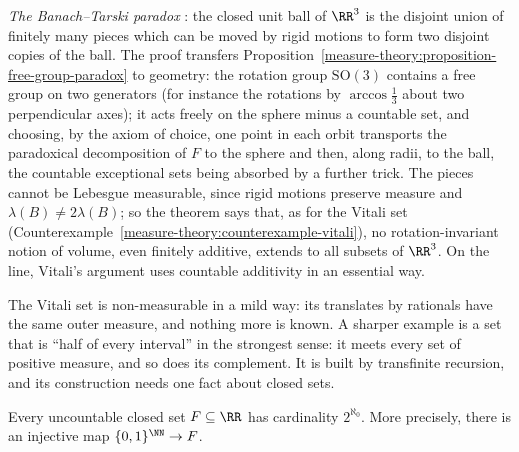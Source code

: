\begin{remark}\label{measure-theory:remark-banach-tarski}
\emph{The Banach--Tarski paradox} \cite{banach-tarski-1924}: the closed unit ball of $\RR^3$ is the disjoint union of finitely many pieces which can be moved by rigid motions to form two
disjoint copies of the ball. The proof transfers Proposition~\ref{measure-theory:proposition-free-group-paradox} to geometry: the rotation group $\mathrm{SO}(3)$ contains a free group on two generators (for
instance the rotations by $\arccos\frac13$ about two perpendicular axes); it acts freely on the sphere minus a countable set, and choosing, by the axiom of choice, one point in each orbit transports the
paradoxical decomposition of $F$ to the sphere and then, along radii, to the ball, the countable exceptional sets being absorbed by a further trick. The pieces cannot be Lebesgue measurable, since
rigid motions preserve measure and $\lambda(B) \neq 2\lambda(B)$; so the theorem says that, as for the Vitali set (Counterexample~\ref{measure-theory:counterexample-vitali}), no rotation-invariant notion
of volume, even finitely additive, extends to all subsets of $\RR^3$. On the line, Vitali's argument uses countable additivity in an essential way.
\end{remark}

The Vitali set is non-measurable in a mild way: its translates by rationals have the same outer measure, and nothing more is known. A sharper example is a set that is ``half of every interval''
in the strongest sense: it meets every set of positive measure, and so does its complement. It is built by transfinite recursion, and its construction needs one fact about closed sets.

\begin{lemma}\label{measure-theory:lemma-cantor-bendixson}
Every uncountable closed set $F \subseteq \RR$ has cardinality $2^{\aleph_0}$. More precisely, there is an injective map $\{0, 1\}^\NN \to F$.
\end{lemma}

